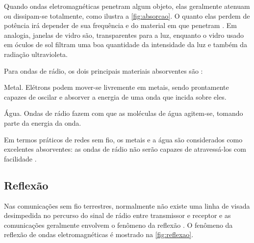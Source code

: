 Quando ondas eletromagnéticas penetram algum objeto, elas geralmente atenuam ou dissipam-se totalmente, como ilustra a \autoref{fig:absorcao}. O quanto elas perdem de potência irá depender de sua frequência e do material em que penetram \cite{flickenger2008}. Em analogia, janelas de vidro são, transparentes para a luz, enquanto o vidro usado em óculos de sol filtram uma boa quantidade da intensidade da luz e também da radiação ultravioleta.

\begin{figure}[H]
	\centering
\end{figure}

Para ondas de rádio, os dois principais materiais absorventes são \cite{flickenger2008}:

\begin{compactitem}
	\item Metal. Elétrons podem mover-se livremente em metais, sendo prontamente capazes de oscilar e absorver a energia de uma onda que incida sobre eles.
	\item Água. Ondas de rádio fazem com que as moléculas de água agitem-se, tomando parte da energia da onda.
\end{compactitem}

Em termos práticos de redes sem fio, os metais e a água são considerados como excelentes absorventes: as ondas de rádio não serão capazes de atravessá-los com facilidade \cite{flickenger2008}.

\subsection{Reflexão}
\label{sub:reflexao}

Nas comunicações sem fio terrestres, normalmente não existe uma linha de visada desimpedida no percurso do sinal de rádio entre transmissor e receptor e as comunicações geralmente envolvem o fenômeno da reflexão \cite{haykin2008}. O fenômeno da reflexão de ondas eletromagnéticas é mostrado na \autoref{fig:reflexao}.

